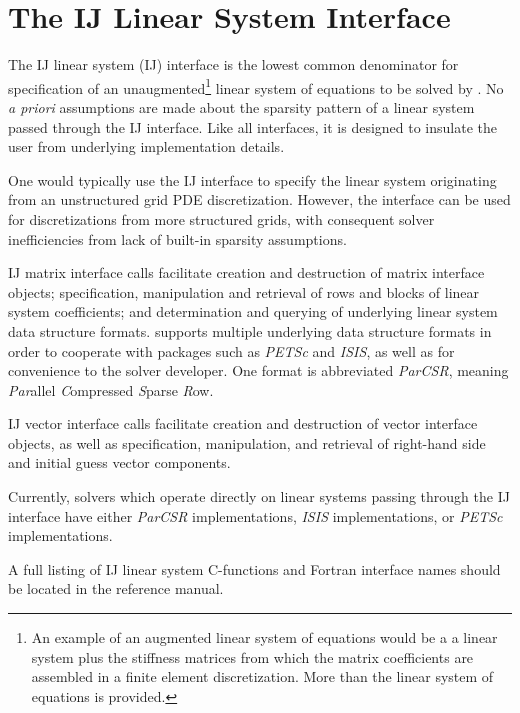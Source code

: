 \chapter{The IJ Linear System Interface}
\label{IJ}

The IJ linear system (IJ) interface is the lowest common denominator
for specification of an unaugmented\footnote{An example of an
augmented linear system of equations would be a a linear system plus
the stiffness matrices from which the matrix coefficients are
assembled in a finite element discretization.  More than the linear
system of equations is provided.}  linear system of equations to be
solved by \hypre{}.  No {\it a priori} assumptions are made about
the sparsity pattern of a linear system passed through the IJ
interface.  Like all \hypre{} interfaces, it is designed to insulate
the user from underlying implementation details.

One would typically use the IJ interface to specify the linear
system originating from an unstructured grid PDE discretization.
However, the interface can be used for discretizations from more
structured grids, with consequent solver inefficiencies from lack
of built-in sparsity assumptions.

IJ matrix interface calls facilitate creation and destruction of 
matrix interface objects; specification, manipulation and retrieval
of rows and blocks of linear system coefficients; and determination
and querying of underlying linear system data structure formats.
\hypre{} supports multiple underlying data structure formats
in order to cooperate with packages such as {\sl PETSc} and
{\sl ISIS}, as well as for convenience to the \hypre{} solver
developer.  One format is abbreviated {\it ParCSR}, meaning
{\it Par}allel {\it C}ompressed {\it S}parse {\it
R}ow.

IJ vector interface calls facilitate creation and destruction of
vector interface objects, as well as specification, manipulation,
and retrieval of right-hand side and initial guess vector components.

Currently, \hypre{} solvers which operate directly on linear systems
passing through the IJ interface have either {\it ParCSR}
implementations, {\sl ISIS} implementations, or {\sl PETSc}
implementations.

A full listing of IJ linear system C-functions and Fortran interface
names should be located in the \hypre{} reference manual.

